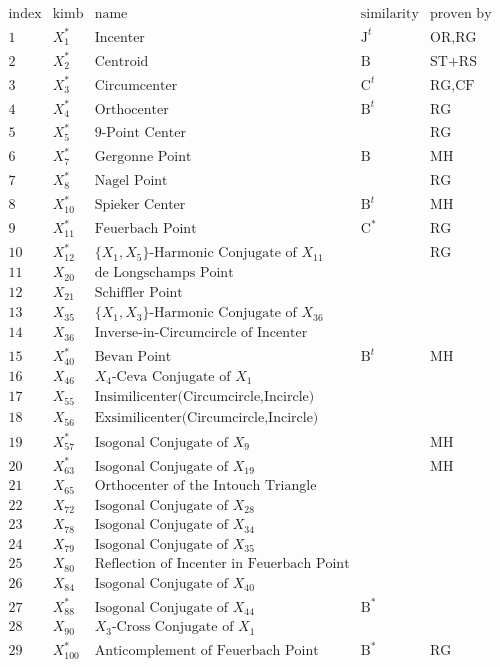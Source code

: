 \documentclass[]{article}
\begin{document}
\[
\begin{array}{cclcc}
\text{index} & \text{kimb} & \text{name} & \text{similarity} & \text{proven by} \\
\hline
 1 & X_{1}^* & \text{Incenter} & \text{J}^t & \text{OR,RG} \\
 2 & X_{2}^* & \text{Centroid} & \text{B} & \text{ST+RS} \\
 3 & X_{3}^* & \text{Circumcenter} & \text{C}^t & \text{RG,CF} \\
 4 & X_{4}^* & \text{Orthocenter} & \text{B}^t & \text{RG}   \\
 5 & X_{5}^* & \text{9-Point Center} & & \text{RG} \\
 6 & X_{7}^* & \text{Gergonne Point} & \text{B} & \text{MH} \\
 7 & X_{8}^* & \text{Nagel Point} & & \text{RG} \\
 8 & X_{10}^* & \text{Spieker Center} & \text{B}^t & \text{MH} \\
 9 & X_{11}^* & \text{Feuerbach Point} & \text{C}^* & \text{RG} \\
 10 & X_{12}^* & \text{$\{X_{1},X_{5}\}$-Harmonic Conjugate of $X_{11}$} & & \text{RG} \\
 11 & X_{20} & \text{de Longschamps Point} & & \\
 12 & X_{21} & \text{Schiffler Point} & & \\
 13 & X_{35} & \text{$\{X_{1},X_{3}\}$-Harmonic Conjugate of $X_{36}$} & & \\
 14 & X_{36} & \text{Inverse-in-Circumcircle of Incenter} & & \\
 15 & X_{40}^* & \text{Bevan Point} & \text{B}^t & \text{MH} \\
 16 & X_{46} & \text{$X_{4}$-Ceva Conjugate of $X_{1}$} & & \\
 17 & X_{55} & \text{Insimilicenter(Circumcircle,Incircle)} & \\
 18 & X_{56} & \text{Exsimilicenter(Circumcircle,Incircle)} & &  \\
 19 & X_{57}^* & \text{Isogonal Conjugate of $X_{9}$} & & \text{MH} \\
 20 & X_{63}^* & \text{Isogonal Conjugate of $X_{19}$} & & \text{MH} \\
 21 & X_{65} & \text{Orthocenter of the Intouch Triangle} & & \\
 22 & X_{72} & \text{Isogonal Conjugate of $X_{28}$} & & \\
 23 & X_{78} & \text{Isogonal Conjugate of $X_{34}$} & & \\
 24 & X_{79} & \text{Isogonal Conjugate of $X_{35}$} & & \\
 25 & X_{80} & \text{Reflection of Incenter in Feuerbach Point} & & \\
 26 & X_{84} & \text{Isogonal Conjugate of $X_{40}$} & & \\
 27 & X_{88}^* & \text{Isogonal Conjugate of $X_{44}$} &  \text{B}^* & \\
 28 & X_{90} & \text{$X_{3}$-Cross Conjugate of $X_{1}$} & \\
 29 & X_{100}^* & \text{Anticomplement of Feuerbach Point} & \text{B}^* & \text{RG} \\
\end{array}
\]
\end{document}
